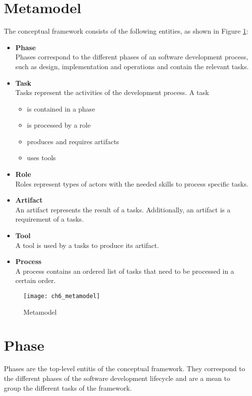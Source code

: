 \section{Metamodel}
\label{sec:ch6_metamodel}
The conceptual framework consists of the following entities, as shown in Figure \ref{fig:ch6_metamodel}:
\begin{itemize}
	\item \textbf{Phase}\\
	Phases correspond to the different phases of an software development process, such as design, implementation and operations and contain the relevant tasks.
	\item \textbf{Task}\\
	Tasks represent the activities of the development process. A task
	\begin{itemize}
		\item is contained in a phase
		\item is processed by a role
		\item produces and requires artifacts
		\item uses tools
	\end{itemize}
	\item \textbf{Role}\\
	Roles represent types of actors with the needed skills to process specific tasks.
	\item \textbf{Artifact}\\
	An artifact represents the result of a tasks. Additionally, an artifact is a requirement of a tasks.
	\item \textbf{Tool}\\
	A tool is used by a tasks to produce its artifact.
	\item \textbf{Process}\\
	A process contains an ordered list of tasks that need to be processed in a certain order.
\end{itemize}

\begin{figure}
	[htpb] \centering 
	\texttt{[image: ch6\_metamodel]} 
	\caption{Metamodel} 
	\label{fig:ch6_metamodel} 
\end{figure}

\section{Phase}
Phases are the top-level entitis of the conceptual framework. They correspond to the different phases of the software development lifecycle and are a mean to group the different tasks of the framework.

